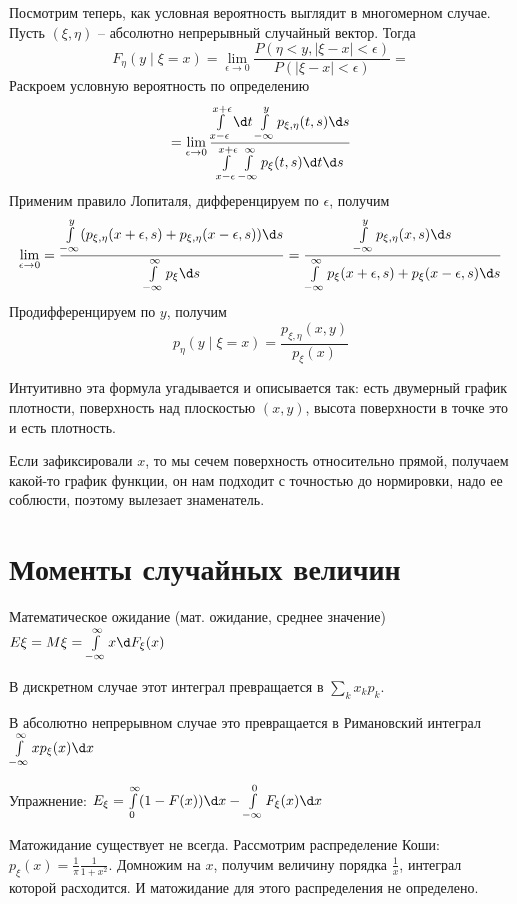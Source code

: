 Посмотрим теперь, как условная вероятность выглядит в многомерном случае.
Пусть $(\xi, \eta)$ -- абсолютно непрерывный случайный вектор. Тогда
$$F_{\eta}(y \mid \xi = x) = \lim\limits_{\epsilon \to 0} \frac{P(\eta < y, |\xi - x| < \epsilon)}{P(|\xi - x| < \epsilon)} =$$
Раскроем условную вероятность по определению
$$ = \lim\limits_{\epsilon \to 0} \frac{\int\limits_{x - \epsilon}^{x + \epsilon} \d t \int\limits_{-\infty}^y p_{\xi, \eta}(t, s) \d s}{\int\limits_{x - \epsilon}^{x + \epsilon} \int\limits_{-\infty}^{\infty}p_\xi(t, s) \d t \d s}$$
Применим правило Лопиталя, дифференцируем по $\epsilon$, получим
$$\lim\limits_{\epsilon \to 0} = \frac{\int\limits_{-\infty}^y (p_{\xi, \eta}(x + \epsilon, s) + p_{\xi, \eta}(x - \epsilon, s)) \d s}{\int\limits_{-\infty}^{\infty} p_\xi\d s} = \frac{\int\limits_{-\infty}^y p_{\xi, \eta}(x, s) \d s}{\int\limits_{-\infty}^{\infty}p_\xi(x + \epsilon, s) + p_\xi(x - \epsilon, s)\d s}$$
Продифференцируем по $y$, получим
$$p_{\eta}(y \mid \xi = x) = \frac{p_{\xi, \eta}(x, y)}{p_{\xi}(x)}$$

Интуитивно эта формула угадывается и описывается так: есть двумерный график плотности, поверхность над плоскостью $(x, y)$, высота поверхности в точке это и есть плотность.

Если зафиксировали $x$, то мы сечем поверхность относительно прямой, получаем какой-то график функции, он нам подходит с точностью до нормировки, надо ее соблюсти, поэтому вылезает знаменатель.

\section{Моменты случайных величин}
\begin{Def}
    Математическое ожидание (мат. ожидание, среднее значение) $E\xi = M\xi = \int\limits_{-\infty}^\infty x \d F_\xi(x)$

    В дискретном случае этот интеграл превращается в $\sum\limits_k x_k p_k$.

    В абсолютно непрерывном случае это превращается в Римановский интеграл $\int\limits_{-\infty}^\infty xp_\xi(x) \d x$
\end{Def}

Упражнение: $E_\xi = \int\limits_0^\infty (1 - F(x)) \d x - \int\limits_{-\infty}^0 F_\xi(x) \d x$

\begin{exmp}
Матожидание существует не всегда.
Рассмотрим распределение Коши: $p_\xi(x) = \frac{1}{\pi}\frac{1}{1 + x^2}$. Домножим на $x$, получим величину порядка $\frac{1}{x}$, интеграл которой расходится. 
И матожидание для этого распределения не определено.
\end{exmp}

